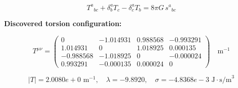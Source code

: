 
\begin{equation}
  T^a{}_{bc} + \delta^a_b T_c - \delta^a_c T_b = 8\pi G \, s^a{}_{bc}
\end{equation}

\textbf{Discovered torsion configuration:}

\begin{equation}
  T^{\mu\nu} = \begin{pmatrix}
    0 & -1.014931 & 0.988568 & -0.993291 \\
    1.014931 & 0 & 1.018925 & 0.000135 \\
    -0.988568 & -1.018925 & 0 & -0.000024 \\
    0.993291 & -0.000135 & 0.000024 & 0
  \end{pmatrix} \quad \text{m}^{-1}
\end{equation}

\begin{equation}
  |T| = 2.0080e+0 \text{ m}^{-1}, \quad
  \lambda = -9.8920, \quad
  \sigma = -4.8368e-3 \text{ J}\cdot\text{s/m}^3
\end{equation}